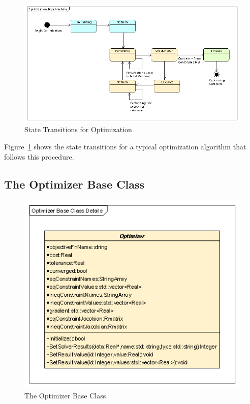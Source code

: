 \begin{figure}[htb]
\begin{center}
\includegraphics[400,220]{Images/OptimizationStateMachine.png}
\caption{\label{figure:OptimizationStateMachine}State Transitions for Optimization}
\end{center}
\end{figure}

\noindent Figure~\ref{figure:OptimizationStateMachine} shows the state transitions for a typical
optimization
algorithm that follows this procedure.

\subsection{The Optimizer Base Class}

\begin{figure}[htb]
\begin{center}
\includegraphics[240,228]{Images/OptimizerBaseClassDetails.png}
\caption{\label{figure:OptimizerBaseClass}The Optimizer Base Class}
\end{center}
\end{figure}

